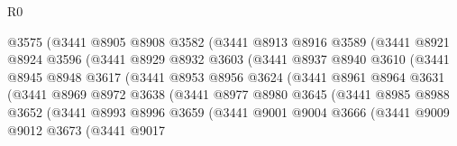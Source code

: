 \begin{lexlean}{R0}
\begin{coremodule}
                        @3575
                        (@3441
                          @8905
                          @8908
                          @3582
                          (@3441
                            @8913
                            @8916
                            @3589
                            (@3441
                              @8921
                              @8924
                              @3596
                              (@3441
                                @8929
                                @8932
                                @3603
                                (@3441
                                  @8937
                                  @8940
                                  @3610
                                  (@3441
                                    @8945
                                    @8948
                                    @3617
                                    (@3441
                                      @8953
                                      @8956
                                      @3624
                                      (@3441
                                        @8961
                                        @8964
                                        @3631
                                        (@3441
                                          @8969
                                          @8972
                                          @3638
                                          (@3441
                                            @8977
                                            @8980
                                            @3645
                                            (@3441
                                              @8985
                                              @8988
                                              @3652
                                              (@3441
                                                @8993
                                                @8996
                                                @3659
                                                (@3441
                                                  @9001
                                                  @9004
                                                  @3666
                                                  (@3441
                                                    @9009
                                                    @9012
                                                    @3673
                                                    (@3441
                                                      @9017

\end{coremodule}
\end{lexlean}
